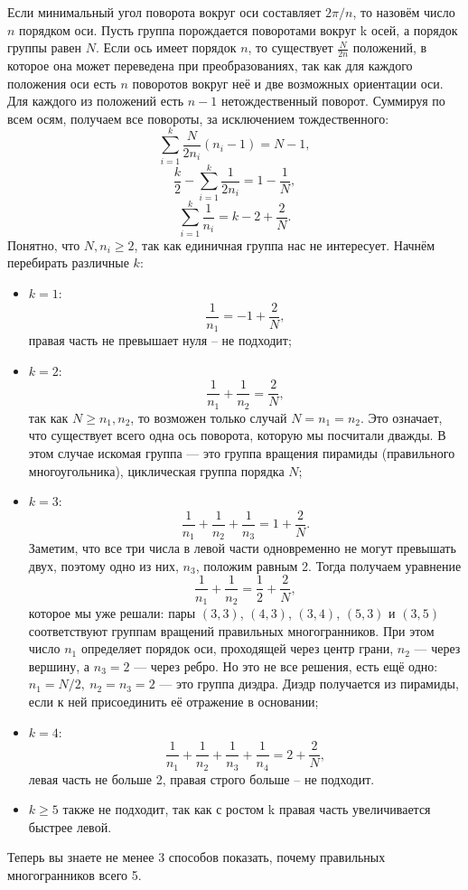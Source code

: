 Если минимальный угол поворота вокруг оси составляет \( 2\pi/n \), то назовём число \(n\) порядком оси. Пусть группа порождается поворотами вокруг k осей, а порядок группы равен \(N\). Если ось имеет порядок \(n\), то существует \( \frac{N}{2n} \) положений, в которое она может переведена при преобразованиях, так как для каждого положения оси есть \(n\) поворотов вокруг неё и две возможных ориентации оси. Для каждого из положений есть \( n-1 \) нетождественный поворот. Суммируя по всем осям, получаем все повороты, за исключением тождественного:
\[
    \sum_{i=1}^k \frac{N}{2n_i}(n_i-1) = N - 1,
\]
\[
    \frac{k}{2} - \sum_{i=1}^k \frac{1}{2n_i} = 1 - \frac{1}{N},
\]
\[
    \sum_{i=1}^k \frac{1}{n_i} = k - 2 + \frac{2}{N}.
\]
Понятно, что \( N, n_i \ge 2 \), так как единичная группа нас не интересует. Начнём перебирать различные \( k \):
\begin{itemize}
  \item \(k=1\): \[ \frac{1}{n_1} = -1 + \frac{2}{N}, \]  правая часть не превышает нуля -- не подходит;
  \item \(k=2\): \[ \frac{1}{n_1} + \frac{1}{n_2} = \frac{2}{N}, \]  так как \( N \ge n_1, n_2 \), то возможен только случай \(N=n_1=n_2\). Это означает, что существует всего одна ось поворота, которую мы посчитали дважды. В этом случае искомая группа --- это группа вращения пирамиды (правильного многоугольника), циклическая группа порядка \( N \);
  \item \(k=3\): \[ \frac{1}{n_1} + \frac{1}{n_2} + \frac{1}{n_3} = 1 + \frac{2}{N}. \]  Заметим, что все три числа в левой части одновременно не могут превышать двух, поэтому одно из них, \(n_3\), положим равным 2. Тогда получаем уравнение \[ \frac{1}{n_1} + \frac{1}{n_2} = \frac{1}{2} + \frac{2}{N}, \] которое мы уже решали: пары \( (3,3) \), \( (4,3) \), \( (3,4) \), \( (5,3) \) и \( (3,5) \) соответствуют группам вращений правильных многогранников. При этом число \( n_1 \) определяет порядок оси, проходящей через центр грани, \( n_2 \) --- через вершину, а \(n_3 = 2\) --- через ребро.
Но это не все решения, есть ещё одно: \( n_1 = N/2,\ n_2=n_3=2 \) --- это группа диэдра. Диэдр получается из пирамиды, если к ней присоединить её отражение в основании;
  \item \(k=4\): \[ \frac{1}{n_1} + \frac{1}{n_2} + \frac{1}{n_3} + \frac{1}{n_4} = 2 + \frac{2}{N}, \]  левая часть не больше 2, правая строго больше -- не подходит.
  \item \(k \ge 5 \) также не подходит, так как с ростом k правая часть увеличивается быстрее левой.
\end{itemize}

Теперь вы знаете не менее 3 способов показать, почему правильных многогранников всего 5.
